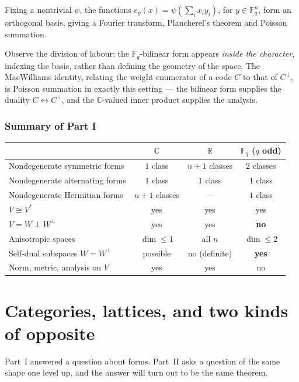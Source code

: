 \documentclass[11pt,a4paper]{article}
\theoremstyle{definition}
\theoremstyle{remark}
\newcommand{\FF}{\mathbb{F}}
\newcommand{\CC}{\mathbb{C}}
\newcommand{\RR}{\mathbb{R}}
\newcommand{\dual}[1]{#1^{*}}
\newcommand{\perpp}{^{\perp}}
\begin{document}
Fixing a nontrivial $\psi$, the functions $e_y(x) = \psi\!\left(\sum_i x_i y_i\right)$, for
$y \in \FF_q^{n}$, form an orthogonal basis, giving a Fourier transform, Plancherel's theorem
and Poisson summation.

Observe the division of labour: the $\FF_q$-bilinear form appears \emph{inside the character},
indexing the basis, rather than defining the geometry of the space. The MacWilliams identity,
relating the weight enumerator of a code $C$ to that of $C\perpp$, is Poisson summation in
exactly this setting --- the bilinear form supplies the duality $C \leftrightarrow C\perpp$,
and the $\CC$-valued inner product supplies the analysis.

\section{Summary of Part I}

\begin{center}
\begin{tabular}{lccc}
\toprule
 & $\CC$ & $\RR$ & $\FF_q$ ($q$ odd) \\
\midrule
Nondegenerate symmetric forms & $1$ class & $n+1$ classes & $2$ classes \\
Nondegenerate alternating forms & $1$ class & $1$ class & $1$ class \\
Nondegenerate Hermitian forms & $n+1$ classes & --- & $1$ class \\
$V \cong \dual{V}$ & yes & yes & yes \\
$V = W \perp W\perpp$ & yes & yes & \textbf{no} \\
Anisotropic spaces & $\dim \leq 1$ & all $n$ & $\dim \leq 2$ \\
Self-dual subspaces $W = W\perpp$ & possible & no (definite) & \textbf{yes} \\
Norm, metric, analysis on $V$ & yes & yes & no \\
\bottomrule
\end{tabular}
\end{center}

\newpage
\part{Categories, lattices, and two kinds of opposite}

\noindent
Part~I answered a question about forms. Part~II asks a question of the same shape one level
up, and the answer will turn out to be the same theorem.
\end{document}
